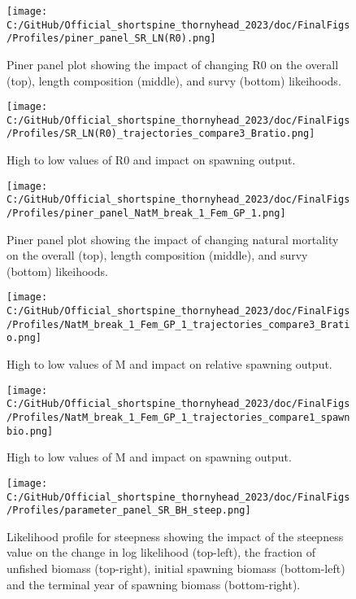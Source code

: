 \documentclass[11pt,
  english,
  letterpaper,
]{article}
\begin{document}
\begin{figure}
\centering
\texttt{[image: C:/GitHub/Official\_shortspine\_thornyhead\_2023/doc/FinalFigs/Profiles/piner\_panel\_SR\_LN(R0).png]}
\caption{Piner panel plot showing the impact of changing R0 on the overall (top), length composition (middle), and survy (bottom) likeihoods.\label{fig:R0_prof}}
\end{figure}

\begin{figure}
\centering
\texttt{[image: C:/GitHub/Official\_shortspine\_thornyhead\_2023/doc/FinalFigs/Profiles/SR\_LN(R0)\_trajectories\_compare3\_Bratio.png]}
\caption{High to low values of R0 and impact on spawning output.\label{fig:R0_spawnout}}
\end{figure}

\begin{figure}
\centering
\texttt{[image: C:/GitHub/Official\_shortspine\_thornyhead\_2023/doc/FinalFigs/Profiles/piner\_panel\_NatM\_break\_1\_Fem\_GP\_1.png]}
\caption{Piner panel plot showing the impact of changing natural mortality on the overall (top), length composition (middle), and survy (bottom) likeihoods.\label{fig:M_prof}}
\end{figure}

\begin{figure}
\centering
\texttt{[image: C:/GitHub/Official\_shortspine\_thornyhead\_2023/doc/FinalFigs/Profiles/NatM\_break\_1\_Fem\_GP\_1\_trajectories\_compare3\_Bratio.png]}
\caption{High to low values of M and impact on relative spawning output.\label{fig:M_relspawnout}}
\end{figure}

\begin{figure}
\centering
\texttt{[image: C:/GitHub/Official\_shortspine\_thornyhead\_2023/doc/FinalFigs/Profiles/NatM\_break\_1\_Fem\_GP\_1\_trajectories\_compare1\_spawnbio.png]}
\caption{High to low values of M and impact on spawning output.\label{fig:M_spawnout}}
\end{figure}

\begin{figure}
\centering
\texttt{[image: C:/GitHub/Official\_shortspine\_thornyhead\_2023/doc/FinalFigs/Profiles/parameter\_panel\_SR\_BH\_steep.png]}
\caption{Likelihood profile for steepness showing the impact of the steepness value on the change in log likelihood (top-left), the fraction of unfished biomass (top-right), initial spawning biomass (bottom-left) and the terminal year of spawning biomass (bottom-right).\label{fig:h_prof}}
\end{figure}
\end{document}
